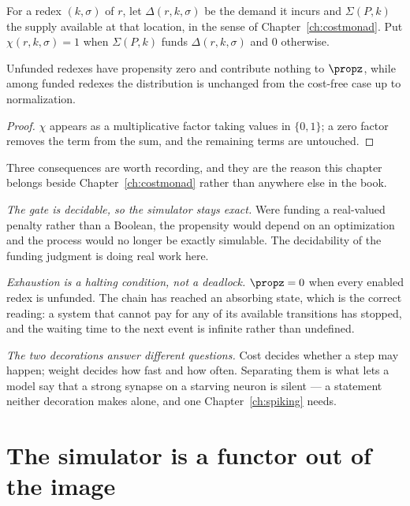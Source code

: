 \begin{definition}
\label{wt:def:gate}
For a redex $(k,\sigma)$ of $r$, let $\Delta(r,k,\sigma)$ be the demand it incurs and
$\Sigma(P,k)$ the supply available at that location, in the sense of
Chapter~\ref{ch:costmonad}. Put $\chi(r,k,\sigma) = 1$ when $\Sigma(P,k)$ funds
$\Delta(r,k,\sigma)$ and $0$ otherwise.
\end{definition}

\begin{proposition}
\label{wt:prop:gate}
Unfunded redexes have propensity zero and contribute nothing to $\propz$, while among
funded redexes the distribution is unchanged from the cost-free case up to normalization.
\end{proposition}

\begin{proof}
$\chi$ appears as a multiplicative factor taking values in $\{0,1\}$; a zero factor
removes the term from the sum, and the remaining terms are untouched.
\end{proof}

Three consequences are worth recording, and they are the reason this chapter belongs
beside Chapter~\ref{ch:costmonad} rather than anywhere else in the book.

\emph{The gate is decidable, so the simulator stays exact.} Were funding a real-valued
penalty rather than a Boolean, the propensity would depend on an optimization and the
process would no longer be exactly simulable. The decidability of the funding judgment is
doing real work here.

\emph{Exhaustion is a halting condition, not a deadlock.} $\propz = 0$ when every enabled
redex is unfunded. The chain has reached an absorbing state, which is the correct reading:
a system that cannot pay for any of its available transitions has stopped, and the waiting
time to the next event is infinite rather than undefined.

\emph{The two decorations answer different questions.} Cost decides whether a step may
happen; weight decides how fast and how often. Separating them is what lets a model say
that a strong synapse on a starving neuron is silent --- a statement neither decoration
makes alone, and one Chapter~\ref{ch:spiking} needs.

\section{The simulator is a functor out of the image}
\label{wt:sec:simulator}

